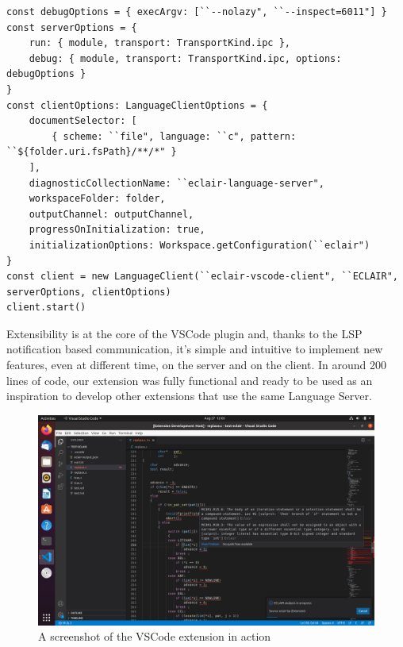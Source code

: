 \begin{lstlisting}[caption={VSCode extension initialization}, label={lst:extension_initialization}]
const debugOptions = { execArgv: [``--nolazy", ``--inspect=6011"] }
const serverOptions = {
	run: { module, transport: TransportKind.ipc },
	debug: { module, transport: TransportKind.ipc, options: debugOptions }
}
const clientOptions: LanguageClientOptions = {
	documentSelector: [
		{ scheme: ``file", language: ``c", pattern: ``${folder.uri.fsPath}/**/*" }
	],
	diagnosticCollectionName: ``eclair-language-server",
	workspaceFolder: folder,
	outputChannel: outputChannel,
	progressOnInitialization: true,
	initializationOptions: Workspace.getConfiguration(``eclair")
}
const client = new LanguageClient(``eclair-vscode-client", ``ECLAIR", serverOptions, clientOptions)
client.start()
\end{lstlisting}

Extensibility is at the core of the VSCode plugin and, thanks to the LSP notification based communication, it's simple and intuitive to implement new features, even at different time, on the server and on the client.
In around 200 lines of code, our extension was fully functional and ready to be used as an inspiration to develop other extensions that use the same Language Server.
\begin{figure}[ht]
	\centering
	\includegraphics[width=1\textwidth]{Immagini/vscode_extension_screenshot.jpg}
	\caption{A screenshot of the VSCode extension in action}
	\label{fig:one}
\end{figure}